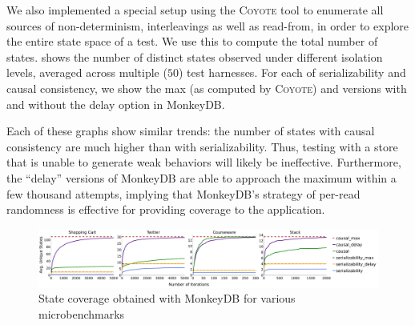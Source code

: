 We also implemented a special setup using the \textsc{Coyote} tool \cite{coyote-web} 
to enumerate all sources of non-determinism, interleavings as well as
read-from, in order to explore the entire state space of a
test. We use this to compute the total number of states. 
shows the number of distinct 
states observed under different isolation levels, averaged across multiple ($50$) test
harnesses. For each of serializability and causal consistency, we show the max
(as computed by \textsc{Coyote}) and versions with and without the delay option
in MonkeyDB. 

Each of these graphs show similar trends: the number of states with
causal consistency are much higher than with serializability. Thus, testing with a
store that is unable to generate weak behaviors will likely be ineffective.
Furthermore, the ``delay'' versions of MonkeyDB are able to approach the 
maximum within a few thousand attempts, implying that MonkeyDB's strategy of
per-read randomness is effective for providing coverage to the application.


\begin{figure}[!h]
	\centering
	\includegraphics[width=1.0\textwidth]{Sources/sql/plots/random_avg.pdf}
	\caption{State coverage obtained with MonkeyDB for various microbenchmarks}
	\label{fig:micro_dfs}
\end{figure}

%
%
%
%
%
%
%	
%	
%	
%	
%
%
%	
%	
%	
%	
%
%	
%	
%	
%	


